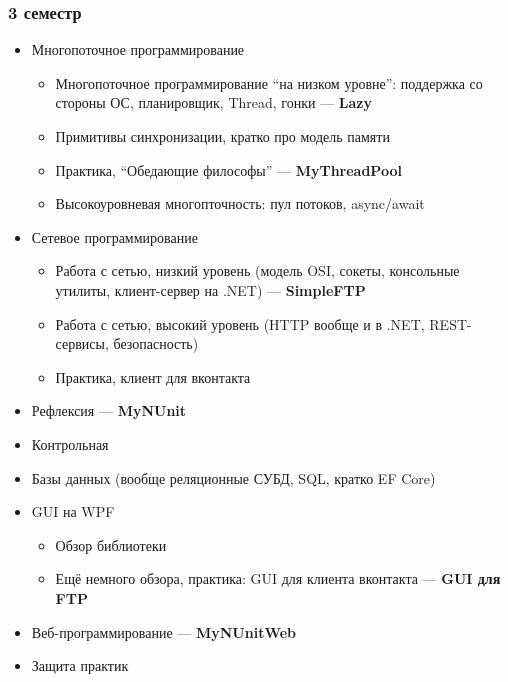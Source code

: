 \documentclass[xetex,mathserif,serif]{beamer}
\begin{document}
    \begin{frame}
        \frametitle{3 семестр}
        \begin{scriptsize}
            \begin{itemize}
                \item Многопоточное программирование
                \begin{itemize}
                    \item \scriptsize{Многопоточное программирование ``на низком уровне'': поддержка со стороны ОС, планировщик, Thread, гонки --- \textbf{Lazy}}
                    \item Примитивы синхронизации, кратко про модель памяти
                    \item Практика, ``Обедающие философы'' --- \textbf{MyThreadPool}
                    \item Высокоуровневая многопточность: пул потоков, async/await
                \end{itemize}
                \item Сетевое программирование
                \begin{itemize}
                    \item \scriptsize{Работа с сетью, низкий уровень (модель OSI, сокеты, консольные утилиты, клиент-сервер на .NET) --- \textbf{SimpleFTP}}
                    \item Работа с сетью, высокий уровень (HTTP вообще и в .NET, REST-сервисы, безопасность)
                    \item Практика, клиент для вконтакта
                \end{itemize}
                \item Рефлексия --- \textbf{MyNUnit}
                \item Контрольная
                \item Базы данных (вообще реляционные СУБД, SQL, кратко EF Core)
                \item GUI на WPF
                \begin{itemize}
                    \item \scriptsize{Обзор библиотеки}
                    \item Ещё немного обзора, практика: GUI для клиента вконтакта --- \textbf{GUI для FTP}
                \end{itemize}
                \item Веб-программирование --- \textbf{MyNUnitWeb}
                \item Защита практик
            \end{itemize}
        \end{scriptsize}
    \end{frame}
\end{document}
